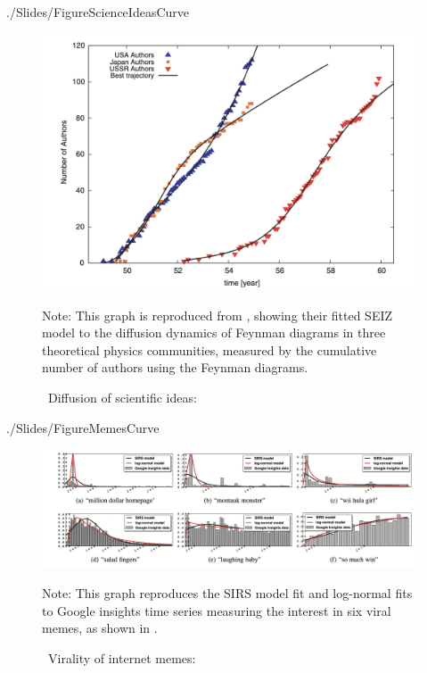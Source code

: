 \newpage


\begin{verbatimwrite}{./Slides/FigureScienceIdeasCurve}
\begin{figure}[!ht] \centering  %
	\caption{ ~Diffusion of scientific ideas: \href{http://web.mit.edu/dikaiser/www/BAKC.PhysA.pdf}{\cite{bettencourt2006power}}}
	\label{fig:science_ideas_curve}
	\centerline{\includegraphics[width=\textwidth]{./figures/Feynman.png}}
		\begin{flushleft}{\footnotesize Note: This graph is reproduced from \cite{bettencourt2006power}, showing their fitted SEIZ model to the diffusion dynamics of Feynman diagrams in three theoretical physics communities, measured by the cumulative number of authors using the Feynman diagrams.}
	\end{flushleft}
\end{figure}
\end{verbatimwrite}%


\newpage

\begin{verbatimwrite}{./Slides/FigureMemesCurve}
\begin{figure}[!ht] \centering  %
	\caption{ ~Virality of internet memes: \href{https://github.com/iworld1991/EpiExp/blob/master/Literature/bauckhage2011insights.pdf}{\cite{bauckhage2011insights}}}
	\label{fig:memes_curve}
	\centerline{\includegraphics[width=\textwidth]{./figures/Memes.png}}
	\begin{flushleft}{\footnotesize Note: This graph reproduces the SIRS model fit and log-normal fits to Google insights time series measuring the interest in six viral memes, as shown in  \cite{bauckhage2011insights}. }
\end{flushleft}
\end{figure}
\end{verbatimwrite}%

